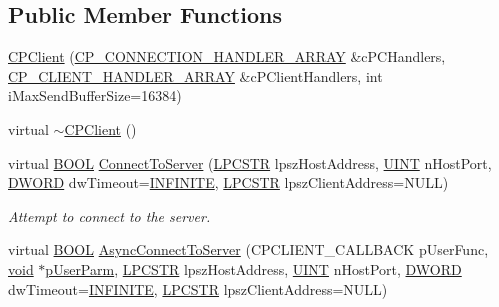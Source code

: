 \subsection*{\-Public \-Member \-Functions}
\begin{DoxyCompactItemize}
\item 
\hyperlink{class_c_p_client_aa5be4005f9e2cafc97ae40e28ea0bda7}{\-C\-P\-Client} (\hyperlink{_c_p_connection_handler_8h_a05bf2fef946dbf14350a5f45bb28f953}{\-C\-P\-\_\-\-C\-O\-N\-N\-E\-C\-T\-I\-O\-N\-\_\-\-H\-A\-N\-D\-L\-E\-R\-\_\-\-A\-R\-R\-A\-Y} \&c\-P\-C\-Handlers, \hyperlink{_c_p_client_handler_8h_a9babc356867a188aa505ce2ce4a81c46}{\-C\-P\-\_\-\-C\-L\-I\-E\-N\-T\-\_\-\-H\-A\-N\-D\-L\-E\-R\-\_\-\-A\-R\-R\-A\-Y} \&c\-P\-Client\-Handlers, int i\-Max\-Send\-Buffer\-Size=16384)
\item 
virtual \hyperlink{class_c_p_client_a8100ec5a3ccf5a3bec05d20f6ba1a3da}{$\sim$\-C\-P\-Client} ()
\item 
virtual \hyperlink{_cpclient_8h_a3be13892ae7076009afcf121347dd319}{\-B\-O\-O\-L} \hyperlink{class_c_p_client_ab78ee2bb6fd59f830435f4d3241c25b2}{\-Connect\-To\-Server} (\hyperlink{_x_plat_8h_a2b72c6037793f6c6381a09c83f27569b}{\-L\-P\-C\-S\-T\-R} lpsz\-Host\-Address, \hyperlink{_x_plat_8h_a45c20c14d3d8790a22153d08ab2eb2ff}{\-U\-I\-N\-T} n\-Host\-Port, \hyperlink{_x_plat_8h_aa39b39d94407451a6ec0226479db68cf}{\-D\-W\-O\-R\-D} dw\-Timeout=\hyperlink{_x_plat_8h_aa84a29002ab81c719c0d07bb446296e0}{\-I\-N\-F\-I\-N\-I\-T\-E}, \hyperlink{_x_plat_8h_a2b72c6037793f6c6381a09c83f27569b}{\-L\-P\-C\-S\-T\-R} lpsz\-Client\-Address=\-N\-U\-L\-L)
\begin{DoxyCompactList}\small\item\em \-Attempt to connect to the server. \end{DoxyCompactList}\item 
virtual \hyperlink{_cpclient_8h_a3be13892ae7076009afcf121347dd319}{\-B\-O\-O\-L} \hyperlink{class_c_p_client_a503733405e241cade1bebf3a935b296f}{\-Async\-Connect\-To\-Server} (\-C\-P\-C\-L\-I\-E\-N\-T\-\_\-\-C\-A\-L\-L\-B\-A\-C\-K p\-User\-Func, \hyperlink{_cpclient_8h_a6464f7480a0fd0ee170cba12b2c0497f}{void} $\ast$\hyperlink{class_c_p_client_a4c7f8139f898544073f5e535d5022ae6}{p\-User\-Parm}, \hyperlink{_x_plat_8h_a2b72c6037793f6c6381a09c83f27569b}{\-L\-P\-C\-S\-T\-R} lpsz\-Host\-Address, \hyperlink{_x_plat_8h_a45c20c14d3d8790a22153d08ab2eb2ff}{\-U\-I\-N\-T} n\-Host\-Port, \hyperlink{_x_plat_8h_aa39b39d94407451a6ec0226479db68cf}{\-D\-W\-O\-R\-D} dw\-Timeout=\hyperlink{_x_plat_8h_aa84a29002ab81c719c0d07bb446296e0}{\-I\-N\-F\-I\-N\-I\-T\-E}, \hyperlink{_x_plat_8h_a2b72c6037793f6c6381a09c83f27569b}{\-L\-P\-C\-S\-T\-R} lpsz\-Client\-Address=\-N\-U\-L\-L)

\end{DoxyCompactItemize}
